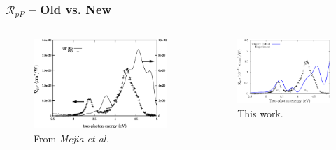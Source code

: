 \documentclass{beamer}
\begin{document}
\begin{frame}
\frametitle{\texorpdfstring{$\mathcal{R}_{pP}$}{RpP} -- Old vs. New}
\begin{columns}
\begin{figure}
\centering
\includegraphics[width=\textwidth]{mejia-000}
\caption{From \emph{Mejia et al.}}
\end{figure}
\begin{figure}
\centering
\includegraphics[width=\textwidth]{fig-rpp}
\caption{This work.}
\end{figure}
\end{columns}
\end{frame}
\end{document}
